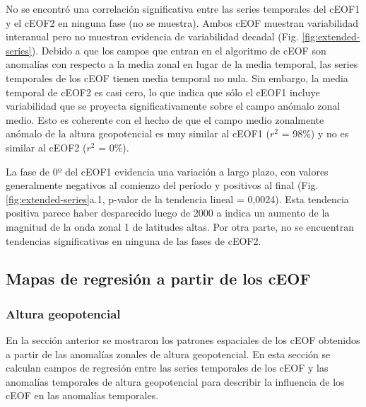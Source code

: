 \documentclass[12pt,oneside,a4paper]{reedthesis}
\begin{document}
No se encontró una correlación significativa entre las series temporales del cEOF1 y el cEOF2 en ninguna fase (no se muestra).
Ambos cEOF muestran variabilidad interanual pero no muestran evidencia de variabilidad decadal (Fig. \ref{fig:extended-series}).
Debido a que los campos que entran en el algoritmo de cEOF son anomalías con respecto a la media zonal en lugar de la media temporal, las series temporales de los cEOF tienen media temporal no nula.
Sin embargo, la media temporal de cEOF2 es casi cero, lo que indica que sólo el cEOF1 incluye variabilidad que se proyecta significativamente sobre el campo anómalo zonal medio.
Esto es coherente con el hecho de que el campo medio zonalmente anómalo de la altura geopotencial es muy similar al cEOF1 (\(r^2\) = 98\%) y no es similar al cEOF2 (\(r^2\) = 0\%).

La fase de 0º del cEOF1 evidencia una variación a largo plazo, con valores generalmente negativos al comienzo del período y positivos al final (Fig. \ref{fig:extended-series}a.1, p-valor de la tendencia lineal = 0,0024).
Esta tendencia positiva parece haber desparecido luego de 2000 a indica un aumento de la magnitud de la onda zonal 1 de latitudes altas.
Por otra parte, no se encuentran tendencias significativas en ninguna de las fases de cEOF2.

\hypertarget{mapas-de-regresiuxf3n-a-partir-de-los-ceof}{%
\subsection{Mapas de regresión a partir de los cEOF}\label{mapas-de-regresiuxf3n-a-partir-de-los-ceof}}

\hypertarget{altura-geopotencial}{%
\subsubsection{Altura geopotencial}\label{altura-geopotencial}}

En la sección anterior se mostraron los patrones espaciales de los cEOF obtenidos a partir de las anomalías zonales de altura geopotencial.
En esta sección se calculan campos de regresión entre las series temporales de los cEOF y las anomalías temporales de altura geopotencial para describir la influencia de los cEOF en las anomalías temporales.
\end{document}
